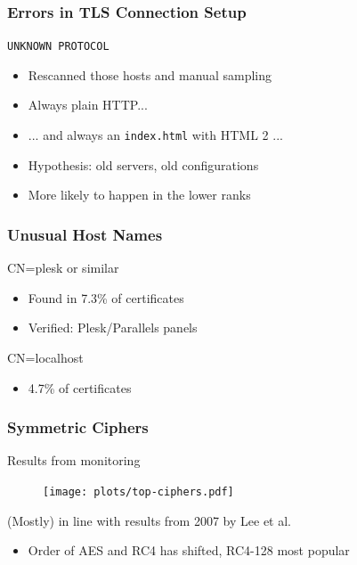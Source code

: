 \begin{frame}
  \frametitle{Errors in TLS Connection Setup}
  \begin{block}{\texttt{UNKNOWN PROTOCOL}}
    \begin{itemize}
      \item Rescanned those hosts and manual sampling
      \item Always plain HTTP...
      \item ... and always an \texttt{index.html} with HTML 2 ...
      \item Hypothesis: old servers, old configurations
      \item More likely to happen in the lower ranks
    \end{itemize}
  \end{block}
\end{frame}

\begin{frame}
  \frametitle{Unusual Host Names}
  \begin{block}{CN=plesk or similar}
   \begin{itemize}
      \item Found in 7.3\% of certificates
      \item Verified: Plesk/Parallels panels
   \end{itemize}
  \end{block}
  \begin{block}{CN=localhost}
    \begin{itemize}
      \item 4.7\% of certificates
    \end{itemize}
  \end{block}
\end{frame}


\begin{frame}
  \frametitle{Symmetric Ciphers}
  \begin{block}{Results from monitoring}
    \begin{figure}
    \centering
      \texttt{[image: plots/top-ciphers.pdf]}
    \end{figure}
  \end{block}
  \begin{block}{(Mostly) in line with results from 2007 by Lee et al.}
   \begin{itemize}
    \item Order of AES and RC4 has shifted, RC4-128 most popular
   \end{itemize}
  \end{block}
\end{frame}


